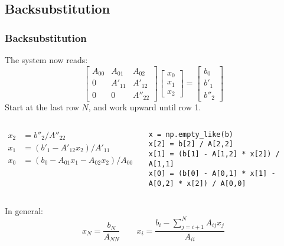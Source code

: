 \subsection*{Backsubstitution}
\begin{frame}[fragile]
  \frametitle{Backsubstitution}
  The system now reads:
  \[
    \begin{bmatrix}
      A_{00} & A_{01} & A_{02}\\ 
      0      & A'_{11} & A'_{12}\\ 
      0 & 0 & A''_{22}
    \end{bmatrix}
    \begin{bmatrix}x_0\\x_1\\x_2\end{bmatrix} = 
    \begin{bmatrix}b_0\\b'_1\\b''_2\end{bmatrix}
  \]
  \pause
  Start at the last row $N$, and work upward until row 1.
  \begin{columns}
    \begin{align*}
     x_2 &= b''_2/A''_{22}\\
     x_1 &= (b'_1 - A'_{12}x_2)/A'_{11}\\
     x_0 &= (b_0 - A_{01}x_1 - A_{02}x_2)/A_{00}
    \end{align*}
    \pause
    \begin{lstlisting}
x = np.empty_like(b)
x[2] = b[2] / A[2,2]
x[1] = (b[1] - A[1,2] * x[2]) / A[1,1]
x[0] = (b[0] - A[0,1] * x[1] - A[0,2] * x[2]) / A[0,0]
    \end{lstlisting}
\end{columns}
In general:
\[
 x_N = \frac{b_N}{A_{NN}} \qquad x_i = \frac{b_i - \sum_{j=i+1}^{N}A_{ij}x_j}{A_{ii}}
\]
\end{frame}

